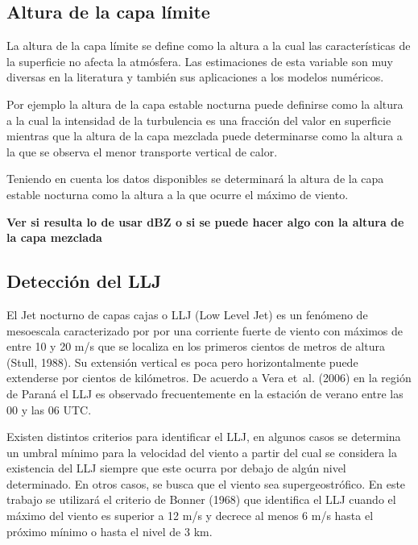 \documentclass[12pt,spanish,oneside]{book}
\begin{document}
\subsection{\texorpdfstring{Altura de la capa límite
\label{sec-pbh}}{Altura de la capa límite }}\label{altura-de-la-capa-limite}

La altura de la capa límite se define como la altura a la cual las
características de la superficie no afecta la atmósfera. Las
estimaciones de esta variable son muy diversas en la literatura y
también sus aplicaciones a los modelos numéricos.

Por ejemplo la altura de la capa estable nocturna puede definirse como
la altura a la cual la intensidad de la turbulencia es una fracción del
valor en superficie mientras que la altura de la capa mezclada puede
determinarse como la altura a la que se observa el menor transporte
vertical de calor.

Teniendo en cuenta los datos disponibles se determinará la altura de la
capa estable nocturna como la altura a la que ocurre el máximo de
viento.

\textbf{Ver si resulta lo de usar dBZ o si se puede hacer algo con la
altura de la capa mezclada}

\subsection{Detección del LLJ}\label{deteccion-del-llj}

El Jet nocturno de capas cajas o LLJ (Low Level Jet) es un fenómeno de
mesoescala caracterizado por por una corriente fuerte de viento con
máximos de entre 10 y 20 m/s que se localiza en los primeros cientos de
metros de altura (Stull, 1988). Su extensión vertical es poca pero
horizontalmente puede extenderse por cientos de kilómetros. De acuerdo a
Vera et~al. (2006) en la región de Paraná el LLJ es observado
frecuentemente en la estación de verano entre las 00 y las 06 UTC.

Existen distintos criterios para identificar el LLJ, en algunos casos se
determina un umbral mínimo para la velocidad del viento a partir del
cual se considera la existencia del LLJ siempre que este ocurra por
debajo de algún nivel determinado. En otros casos, se busca que el
viento sea supergeostrófico. En este trabajo se utilizará el criterio de
Bonner (1968) que identifica el LLJ cuando el máximo del viento es
superior a 12 m/s y decrece al menos 6 m/s hasta el próximo mínimo o
hasta el nivel de 3 km.
\end{document}
